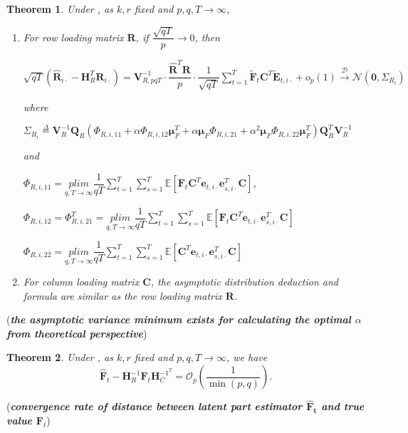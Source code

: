 \documentclass{article}[12pt]
\newtheorem{theorem}{Theorem}
\begin{document}
\begin{theorem}
    \normalfont Under  , as $k,r$ fixed and $p,q,T \rightarrow \infty$,
    \begin{enumerate}
        \item For row loading matrix $\mathbf{R}$, if $\dfrac{\sqrt{qT}}{p} \rightarrow 0$, then
        
        $\sqrt{qT}(\mathbf{\widehat{R}}_{i\cdot}-\mathbf{H}_R^T\mathbf{R}_{i\cdot}) = \mathbf{V}_{R,pqT}^{-1}\cdot \dfrac{\mathbf{\widehat{R}}^T\mathbf{R}}{p}\cdot \dfrac{1}{\sqrt{qT}}\sum\limits_{t=1}^T\mathbf{\widetilde{F}}_t\mathbf{C}^T\mathbf{\widetilde{E}}_{t,i\cdot}+o_p(1) \xrightarrow{\mathcal{D}} \mathcal{N}(\mathbf{0},\Sigma_{R_i})$
        
        where             

        $\Sigma_{R_i}  \overset{\Delta}{=} \mathbf{V}_R^{-1}\mathbf{Q}_R(\Phi_{R,i,11}+\alpha\Phi_{R,i,12}\bm{\mu}_F^T+\alpha\bm{\mu}_F\Phi_{R,i,21}+\alpha^2\bm{\mu}_F\Phi_{R,i,22}\bm{\mu}_F^T)\mathbf{Q}_R^T\mathbf{V}_R^{-1}$

        and 

        $\Phi_{R,i,11} = \underset{q,T \rightarrow \infty}{plim}\dfrac{1}{qT}\sum\limits_{t=1}^T\sum\limits_{s=1}^T\mathbb{E}\left[\mathbf{F}_t\mathbf{C}^T\mathbf{e}_{t,i\cdot}\mathbf{e}_{s,i\cdot}^T\mathbf{C}\right]$,

        $\Phi_{R,i,12} = \Phi_{R,i,21}^T = \underset{q,T \rightarrow \infty}{plim}\dfrac{1}{qT}\sum\limits_{t=1}^T\sum\limits_{s=1}^T\mathbb{E}\left[\mathbf{F}_t\mathbf{C}^T\mathbf{e}_{t,i\cdot}\mathbf{e}_{s,i\cdot}^T\mathbf{C}\right]$

        $\Phi_{R,i,22}  = \underset{q,T \rightarrow \infty}{plim}\dfrac{1}{qT}\sum\limits_{t=1}^T\sum\limits_{s=1}^T\mathbb{E}\left[\mathbf{C}^T\mathbf{e}_{t,i\cdot}\mathbf{e}_{s,i\cdot}^T\mathbf{C}\right]$

        \item For column loading matrix $\mathbf{C}$, the asymptotic distribution deduction and formula are similar as the row loading matrix $\mathbf{R}$.   
    \end{enumerate}
\end{theorem}
\noindent (\textbf{\textit{the asymptotic variance minimum exists for calculating the optimal $\alpha$ from theoretical perspective}})

\begin{theorem}
    \normalfont Under  , as $k,r$ fixed and $p,q,T \rightarrow \infty$, we have 
    $$
    \mathbf{\widehat{F}}_t-\mathbf{H}_R^{-1}\mathbf{F}_t\mathbf{H}_C^{-1^T} = \mathcal{O}_p\left(\dfrac{1}{\min\left(p,q\right)}\right).
    $$
\end{theorem}
\noindent (\textbf{\textit{convergence rate of distance between latent part estimator $\mathbf{\widehat{F}_t}$ and true value $\mathbf{F}_t$}})
\end{document}
